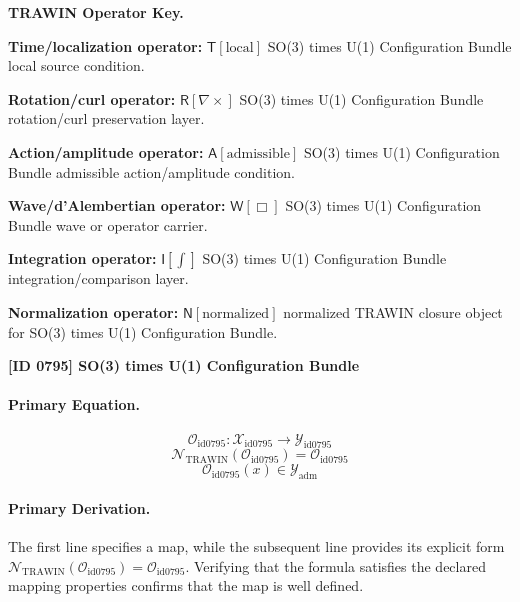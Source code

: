 \par\vspace{0.45\baselineskip}
\noindent\begin{minipage}[t]{\linewidth}
\begingroup
\small
\raggedright
\textbf{TRAWIN Operator Key.}\par
\noindent\textbf{Time/localization operator:} $\mathsf{T}\!\left[\mathrm{local}\right]$ SO(3) times U(1) Configuration Bundle local source condition.\par
\noindent\textbf{Rotation/curl operator:} $\mathsf{R}\!\left[\nabla\times\right]$ SO(3) times U(1) Configuration Bundle rotation/curl preservation layer.\par
\noindent\textbf{Action/amplitude operator:} $\mathsf{A}\!\left[\mathrm{admissible}\right]$ SO(3) times U(1) Configuration Bundle admissible action/amplitude condition.\par
\noindent\textbf{Wave/d'Alembertian operator:} $\mathsf{W}\!\left[\Box\right]$ SO(3) times U(1) Configuration Bundle wave or operator carrier.\par
\noindent\textbf{Integration operator:} $\mathsf{I}\!\left[\int\right]$ SO(3) times U(1) Configuration Bundle integration/comparison layer.\par
\noindent\textbf{Normalization operator:} $\mathsf{N}\!\left[\mathrm{normalized}\right]$ normalized TRAWIN closure object for SO(3) times U(1) Configuration Bundle.\par
\endgroup
\end{minipage}

\clearpage
\noindent\textbf{[ID 0795] SO(3) times U(1) Configuration Bundle}\par
\vspace{0.35em}
\paragraph{Primary Equation.}
\[
\mathcal{O}_{\mathrm{id0795}}:\mathcal{X}_{\mathrm{id0795}}\longrightarrow\mathcal{Y}_{\mathrm{id0795}}
\]
\[
\mathcal{N}_{\mathrm{TRAWIN}}(\mathcal{O}_{\mathrm{id0795}})=\mathcal{O}_{\mathrm{id0795}}
\]
\[
\mathcal{O}_{\mathrm{id0795}}(x)\in\mathcal{Y}_{\mathrm{adm}}
\]

\paragraph{Primary Derivation.}
The first line specifies a map, while the subsequent line provides its explicit form \( \mathcal{N}_{\mathrm{TRAWIN}}(\mathcal{O}_{\mathrm{id0795}})=\mathcal{O}_{\mathrm{id0795}} \). Verifying that the formula satisfies the declared mapping properties confirms that the map is well defined.
